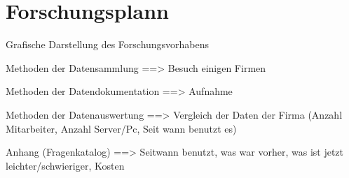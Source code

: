 \section{Forschungsplann}

Grafische Darstellung des Forschungsvorhabens 

Methoden der Datensammlung ==> Besuch einigen Firmen


Methoden der Datendokumentation  ==> Aufnahme


Methoden der Datenauswertung ==> Vergleich der Daten der Firma (Anzahl Mitarbeiter, Anzahl Server/Pc, Seit wann benutzt es)


Anhang (Fragenkatalog) ==> Seitwann benutzt, was war vorher, was ist jetzt leichter/schwieriger, Kosten